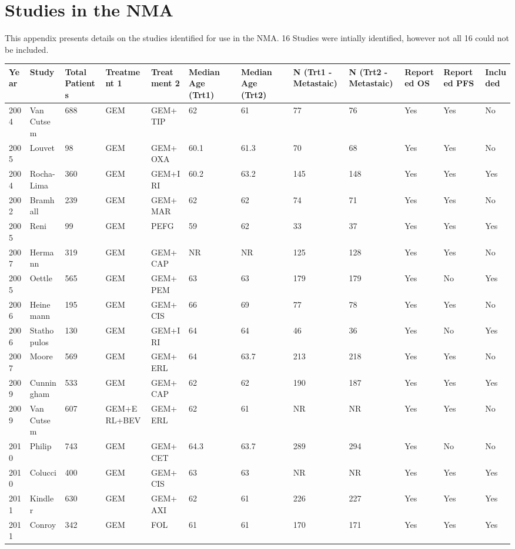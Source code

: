\chapter{Studies in the NMA}\label{studies}

This appendix presents details on the studies identified for use in the NMA. 16 Studies were intially identified, however not all 16 could not be included.

\begin{sidewaystable}
        \centering
        \begin{tabular}{|l|l|l|l|l|l|l|l|l|l|l|l|}
            \hline
                \textbf{Year} & \textbf{Study} & \textbf{Total Patients} & \textbf{Treatment 1} & \textbf{Treatment 2} & \textbf{Median Age (Trt1)} & \textbf{Median Age (Trt2)} & \textbf{N (Trt1 - Metastaic)} & \textbf{N (Trt2 - Metastaic)} & \textbf{Reported OS} & \textbf{Reported PFS} & \textbf{Included} \\ \hline
                2004 & Van Cutsem & 688 & GEM & GEM+TIP & 62 & 61 & 77 & 76 & Yes & Yes & No \\ \hline
                2005 & Louvet & 98 & GEM & GEM+OXA & 60.1 & 61.3 & 70 & 68 & Yes & Yes & No \\ \hline
                2004 & Rocha-Lima & 360 & GEM & GEM+IRI & 60.2 & 63.2 & 145 & 148 & Yes & Yes & Yes \\ \hline
                2002 & Bramhall & 239 & GEM & GEM+MAR & 62 & 62 & 74 & 71 & Yes & Yes & No \\ \hline
                2005 & Reni & 99 & GEM & PEFG & 59 & 62 & 33 & 37 & Yes & Yes & Yes \\ \hline
                2007 & Hermann & 319 & GEM & GEM+CAP & NR & NR & 125 & 128 & Yes & Yes & No \\ \hline
                2005 & Oettle & 565 & GEM & GEM+PEM & 63 & 63 & 179 & 179 & Yes & No & Yes \\ \hline
                2006 & Heinemann & 195 & GEM & GEM+CIS & 66 & 69 & 77 & 78 & Yes & Yes & No \\ \hline
                2006 & Stathopulos & 130 & GEM & GEM+IRI & 64 & 64 & 46 & 36 & Yes & No & Yes \\ \hline
                2007 & Moore & 569 & GEM & GEM+ERL & 64 & 63.7 & 213 & 218 & Yes & Yes & No \\ \hline
                2009 & Cunningham & 533 & GEM & GEM+CAP & 62 & 62 & 190 & 187 & Yes & Yes & Yes \\ \hline
                2009 & Van Cutsem & 607 & GEM+ERL+BEV & GEM+ERL & 62 & 61 & NR & NR & Yes & Yes & No \\ \hline
                2010 & Philip & 743 & GEM & GEM+CET & 64.3 & 63.7 & 289 & 294 & Yes & No & No \\ \hline
                2010 & Colucci & 400 & GEM & GEM+CIS & 63 & 63 & NR & NR & Yes & Yes & Yes \\ \hline
                2011 & Kindler & 630 & GEM & GEM+AXI & 62 & 61 & 226 & 227 & Yes & Yes & Yes \\ \hline
                2011 & Conroy & 342 & GEM & FOL & 61 & 61 & 170 & 171 & Yes & Yes & Yes \\ \hline
            \end{tabular}
\end{sidewaystable}